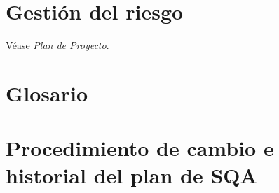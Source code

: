 \documentclass[11pt, a4paper, twoside, titlepage]{article}
\begin{document}
	\section{Gestión del riesgo}
		Véase \textit{Plan de Proyecto}.

	\section{Glosario}
		\printglossaries
	\section{Procedimiento de cambio e historial del plan de SQA} %

	\appendix
	\newpage
	
	
\end{document}
